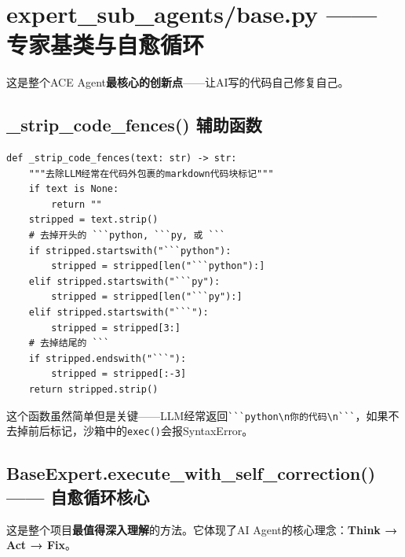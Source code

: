 \documentclass[11pt,a4paper]{ctexbook}
\begin{document}
\section{expert\_sub\_agents/base.py —— 专家基类与自愈循环}

这是整个ACE Agent\textbf{最核心的创新点}——让AI写的代码自己修复自己。

\subsection{\_strip\_code\_fences() 辅助函数}

\begin{verbatim}
def _strip_code_fences(text: str) -> str:
    """去除LLM经常在代码外包裹的markdown代码块标记"""
    if text is None:
        return ""
    stripped = text.strip()
    # 去掉开头的 ```python, ```py, 或 ```
    if stripped.startswith("```python"):
        stripped = stripped[len("```python"):]
    elif stripped.startswith("```py"):
        stripped = stripped[len("```py"):]
    elif stripped.startswith("```"):
        stripped = stripped[3:]
    # 去掉结尾的 ```
    if stripped.endswith("```"):
        stripped = stripped[:-3]
    return stripped.strip()
\end{verbatim}

\begin{plainbox}
    这个函数虽然简单但是关键——LLM经常返回\verb|```python\n你的代码\n```|，如果不去掉前后标记，沙箱中的\verb|exec()|会报SyntaxError。
\end{plainbox}

\subsection{BaseExpert.execute\_with\_self\_correction() —— 自愈循环核心}

这是整个项目\textbf{最值得深入理解}的方法。它体现了AI Agent的核心理念：\textbf{Think → Act → Fix}。
\end{document}

